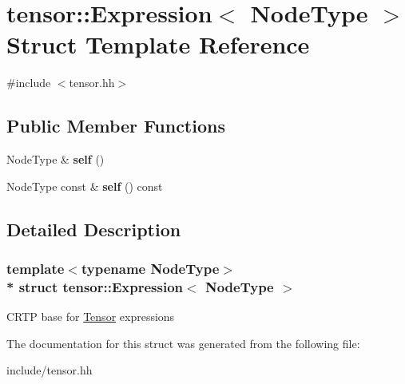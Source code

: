 \hypertarget{structtensor_1_1Expression}{}\section{tensor\+:\+:Expression$<$ Node\+Type $>$ Struct Template Reference}
\label{structtensor_1_1Expression}


{\ttfamily \#include $<$tensor.\+hh$>$}

\subsection*{Public Member Functions}
\begin{DoxyCompactItemize}
\item 
Node\+Type \& {\bfseries self} ()\hypertarget{structtensor_1_1Expression_ac6e6103ed3ad773a8272b1012f8a0093}{}\label{structtensor_1_1Expression_ac6e6103ed3ad773a8272b1012f8a0093}

\item 
Node\+Type const \& {\bfseries self} () const \hypertarget{structtensor_1_1Expression_a24ffcf47cf0751eee4c61ea762f8dcc8}{}\label{structtensor_1_1Expression_a24ffcf47cf0751eee4c61ea762f8dcc8}

\end{DoxyCompactItemize}


\subsection{Detailed Description}
\subsubsection*{template$<$typename Node\+Type$>$\\*
struct tensor\+::\+Expression$<$ Node\+Type $>$}

C\+R\+TP base for \hyperlink{classtensor_1_1Tensor}{Tensor} expressions 

The documentation for this struct was generated from the following file\+:\begin{DoxyCompactItemize}
\item 
include/tensor.\+hh\end{DoxyCompactItemize}

